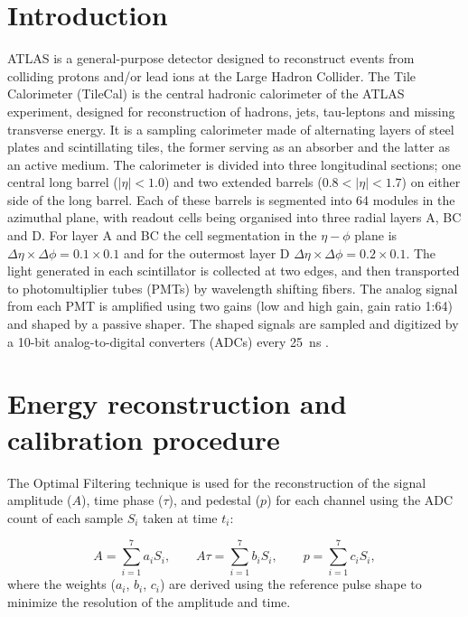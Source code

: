 \documentclass[10pt]{article}
\begin{document}
\normalsize 


\section{Introduction}

ATLAS \cite{1} is a general-purpose detector designed to reconstruct events from colliding protons and/or lead ions at the Large Hadron Collider. The Tile Calorimeter (TileCal) is the central hadronic calorimeter of the ATLAS experiment, designed for reconstruction of hadrons, jets, tau-leptons and missing transverse energy. It is a sampling calorimeter made of alternating layers of steel plates and scintillating tiles, the former serving as an absorber and the latter as an active medium. The calorimeter is divided into three longitudinal sections; one central long barrel ($|\eta|<1.0$) and two extended barrels ($0.8 < |\eta| < 1.7$) on either side of the long barrel. Each of these barrels is segmented into 64 modules in the azimuthal plane, with readout cells being organised into three radial layers A, BC and D. For layer A and BC the cell segmentation in the $\eta - \phi$ plane is $\Delta \eta \times \Delta \phi = 0.1 \times 0.1$ and for the outermost layer D $\Delta \eta \times \Delta \phi = 0.2 \times 0.1$. The light generated in each scintillator is collected at two edges, and then transported to photomultiplier tubes (PMTs) by wavelength shifting fibers. The analog signal from each PMT is amplified using two gains (low and high gain, gain ratio 1:64) and shaped by a passive shaper. The shaped signals are sampled and digitized by a 10-bit analog-to-digital converters (ADCs) every 25~ns \cite{2}.  

\section{Energy reconstruction and calibration procedure}
The Optimal Filtering technique \cite{OF} is used for the reconstruction of the signal amplitude ($A$), time phase ($\tau$), and pedestal ($p$) for each channel using the ADC count of each sample $S_i$ taken at time $t_i$:

 \begin{equation} \nonumber
      A = \sum\limits_{i=1}^{7} a_i S_i, \qquad A \tau = \sum\limits_{i=1}^{7} b_i S_i, \qquad p = \sum\limits_{i=1}^{7} c_i S_i, 
    \end{equation}
where the weights ($a_i$, $b_i$, $c_i$) are derived using the reference pulse shape to minimize the resolution of the amplitude and time.
\end{document}
